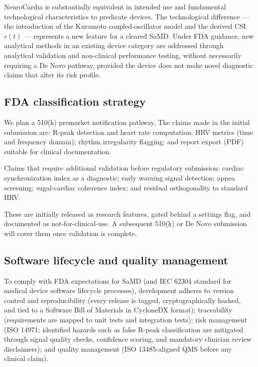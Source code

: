 \documentclass[11pt]{article}
\begin{document}
NeuroCardia is substantially equivalent in intended use and fundamental
technological characteristics to predicate devices. The technological
difference --- the introduction of the Kuramoto coupled-oscillator
model and the derived CSI $r(t)$ --- represents a new feature for a
cleared SaMD. Under FDA guidance, new analytical methods in an existing
device category are addressed through analytical validation and
non-clinical performance testing, without necessarily requiring a
De Novo pathway, provided the device does not make novel diagnostic
claims that alter its risk profile.

\subsection{FDA classification strategy}

We plan a 510(k) premarket notification pathway. The claims made in the
initial submission are: R-peak detection and heart rate computation;
HRV metrics (time and frequency domain); rhythm irregularity flagging;
and report export (PDF) suitable for clinical documentation.

Claims that require additional validation before regulatory submission:
cardiac synchronization index as a diagnostic; early warning signal
detection; apnea screening; vagal-cardiac coherence index; and residual
orthogonality to standard HRV.

These are initially released as research features, gated behind a
settings flag, and documented as not-for-clinical-use. A subsequent
510(k) or De Novo submission will cover them once validation is
complete.

\subsection{Software lifecycle and quality management}

To comply with FDA expectations for SaMD (and IEC 62304 standard for
medical device software lifecycle processes), development adheres to
version control and reproducibility (every release is tagged,
cryptographically hashed, and tied to a Software Bill of Materials in
CycloneDX format); traceability (requirements are mapped to unit tests
and integration tests); risk management (ISO 14971; identified hazards
such as false R-peak classification are mitigated through signal
quality checks, confidence scoring, and mandatory clinician review
disclaimers); and quality management (ISO 13485-aligned QMS before any
clinical claim).
\end{document}
